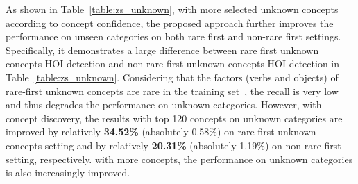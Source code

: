 \documentclass[runningheads]{llncs}
\begin{document}
As shown in Table~\ref{table:zs_unknown}, with more selected unknown concepts according to concept confidence, the proposed approach further improves the performance on unseen categories on both rare first and non-rare first settings. Specifically, it demonstrates a large difference between rare first unknown concepts HOI detection and non-rare first unknown concepts HOI detection in Table~\ref{table:zs_unknown}. Considering that the factors (verbs and objects) of rare-first unknown concepts are rare in the training set~\cite{hou2021fcl}, the recall is very low and thus degrades the performance on unknown categories. However, with concept discovery, the results with top 120 concepts on unknown categories are improved by relatively \textbf{34.52\%} (absolutely 0.58\%) on rare first unknown concepts setting and by relatively \textbf{20.31\%} (absolutely 1.19\%) on non-rare first setting, respectively. with more concepts, the performance on unknown categories is also increasingly improved.
\end{document}
